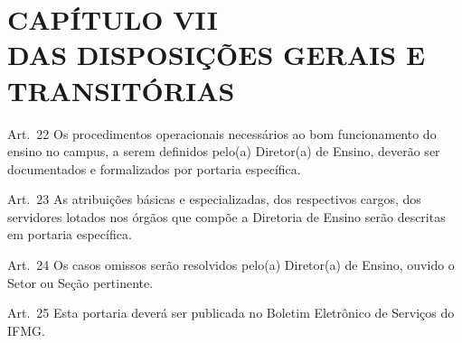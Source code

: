\documentclass[a4paper,12pt]{report}
\begin{document}

\section{CAPÍTULO VII \\ DAS DISPOSIÇÕES GERAIS E TRANSITÓRIAS}

Art.~22 Os procedimentos operacionais necessários ao bom funcionamento do ensino no campus, a serem definidos pelo(a) Diretor(a) de Ensino, deverão ser documentados e formalizados por portaria específica.  

Art.~23 As atribuições básicas e especializadas, dos respectivos cargos, dos servidores lotados nos órgãos que compõe a Diretoria de Ensino serão descritas em portaria específica.

Art.~24 Os casos omissos serão resolvidos pelo(a) Diretor(a) de Ensino, ouvido o Setor ou Seção pertinente.

Art.~25 Esta portaria deverá ser publicada no Boletim Eletrônico de Serviços do IFMG.
\end{document}

